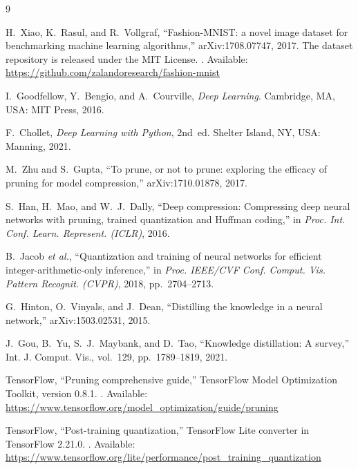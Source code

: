 \documentclass[13pt,a4paper]{article}
\begin{document}
\clearpage
\renewcommand{\refname}{Tài liệu tham khảo}
\begin{thebibliography}{9}

H.~Xiao, K.~Rasul, and R.~Vollgraf, ``Fashion-MNIST: a novel image dataset for benchmarking machine learning algorithms,'' arXiv:1708.07747, 2017.
The dataset repository is released under the MIT License.
\newblock [Online]. Available: \url{https://github.com/zalandoresearch/fashion-mnist}

I.~Goodfellow, Y.~Bengio, and A.~Courville, \textit{Deep Learning}.
Cambridge, MA, USA: MIT Press, 2016.

F.~Chollet, \textit{Deep Learning with Python}, 2nd~ed.
Shelter Island, NY, USA: Manning, 2021.

M.~Zhu and S.~Gupta, ``To prune, or not to prune: exploring the efficacy of pruning for model compression,'' arXiv:1710.01878, 2017.

S.~Han, H.~Mao, and W.~J.~Dally, ``Deep compression: Compressing deep neural networks with pruning, trained quantization and Huffman coding,'' in \textit{Proc. Int. Conf. Learn. Represent. (ICLR)}, 2016.

B.~Jacob \textit{et al.}, ``Quantization and training of neural networks for efficient integer-arithmetic-only inference,'' in \textit{Proc. IEEE/CVF Conf. Comput. Vis. Pattern Recognit. (CVPR)}, 2018, pp.~2704--2713.

G.~Hinton, O.~Vinyals, and J.~Dean, ``Distilling the knowledge in a neural network,'' arXiv:1503.02531, 2015.

J.~Gou, B.~Yu, S.~J.~Maybank, and D.~Tao, ``Knowledge distillation: A survey,'' Int. J. Comput. Vis., vol.~129, pp.~1789--1819, 2021.

TensorFlow, ``Pruning comprehensive guide,'' TensorFlow Model Optimization Toolkit, version 0.8.1.
\newblock [Online]. Available: \url{https://www.tensorflow.org/model_optimization/guide/pruning}

TensorFlow, ``Post-training quantization,'' TensorFlow Lite converter in TensorFlow 2.21.0.
\newblock [Online]. Available: \url{https://www.tensorflow.org/lite/performance/post_training_quantization}

\end{thebibliography}
\end{document}
